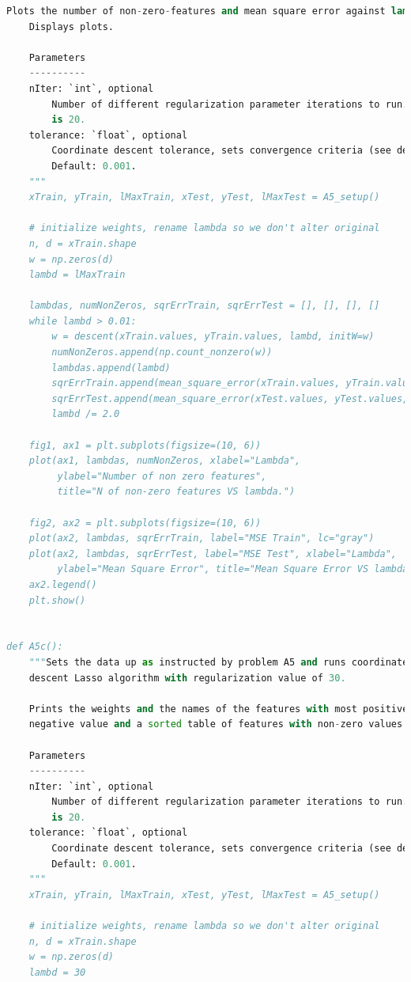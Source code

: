 \documentclass{article}
\newcommand{\1}{\mathbf{1}}
\begin{document}
\begin{enumerate}
\begin{lstlisting}[language=Python]
    Plots the number of non-zero-features and mean square error against lambda.
    Displays plots.

    Parameters
    ----------
    nIter: `int`, optional
        Number of different regularization parameter iterations to run. Default
        is 20.
    tolerance: `float`, optional
        Coordinate descent tolerance, sets convergence criteria (see descent).
        Default: 0.001.
    """
    xTrain, yTrain, lMaxTrain, xTest, yTest, lMaxTest = A5_setup()

    # initialize weights, rename lambda so we don't alter original
    n, d = xTrain.shape
    w = np.zeros(d)
    lambd = lMaxTrain

    lambdas, numNonZeros, sqrErrTrain, sqrErrTest = [], [], [], []
    while lambd > 0.01:
        w = descent(xTrain.values, yTrain.values, lambd, initW=w)
        numNonZeros.append(np.count_nonzero(w))
        lambdas.append(lambd)
        sqrErrTrain.append(mean_square_error(xTrain.values, yTrain.values, w))
        sqrErrTest.append(mean_square_error(xTest.values, yTest.values, w))
        lambd /= 2.0

    fig1, ax1 = plt.subplots(figsize=(10, 6))
    plot(ax1, lambdas, numNonZeros, xlabel="Lambda",
         ylabel="Number of non zero features",
         title="N of non-zero features VS lambda.")

    fig2, ax2 = plt.subplots(figsize=(10, 6))
    plot(ax2, lambdas, sqrErrTrain, label="MSE Train", lc="gray")
    plot(ax2, lambdas, sqrErrTest, label="MSE Test", xlabel="Lambda",
         ylabel="Mean Square Error", title="Mean Square Error VS lambda.")
    ax2.legend()
    plt.show()


def A5c():
    """Sets the data up as instructed by problem A5 and runs coordinate
    descent Lasso algorithm with regularization value of 30. 

    Prints the weights and the names of the features with most positive, most
    negative value and a sorted table of features with non-zero values.

    Parameters
    ----------
    nIter: `int`, optional
        Number of different regularization parameter iterations to run. Default
        is 20.
    tolerance: `float`, optional
        Coordinate descent tolerance, sets convergence criteria (see descent).
        Default: 0.001.
    """
    xTrain, yTrain, lMaxTrain, xTest, yTest, lMaxTest = A5_setup()

    # initialize weights, rename lambda so we don't alter original
    n, d = xTrain.shape
    w = np.zeros(d)
    lambd = 30


\end{lstlisting}
\end{enumerate}
\end{document}
